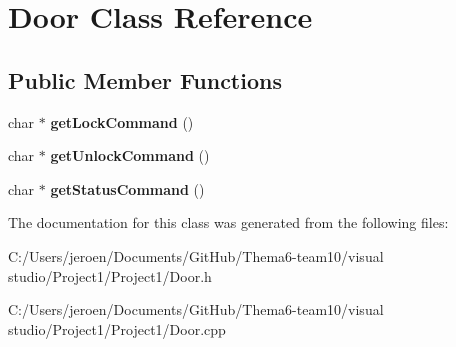 \hypertarget{class_door}{}\section{Door Class Reference}
\label{class_door}
\subsection*{Public Member Functions}
\begin{DoxyCompactItemize}
\item 
char $\ast$ {\bfseries get\+Lock\+Command} ()\hypertarget{class_door_a4283898426c5ec79a5b04885ff094f27}{}\label{class_door_a4283898426c5ec79a5b04885ff094f27}

\item 
char $\ast$ {\bfseries get\+Unlock\+Command} ()\hypertarget{class_door_a7f6bb388e70e0b98efd45f10558d07cc}{}\label{class_door_a7f6bb388e70e0b98efd45f10558d07cc}

\item 
char $\ast$ {\bfseries get\+Status\+Command} ()\hypertarget{class_door_a04f5e66e03b817d6ff9848a5fe81eefc}{}\label{class_door_a04f5e66e03b817d6ff9848a5fe81eefc}

\end{DoxyCompactItemize}


The documentation for this class was generated from the following files\+:\begin{DoxyCompactItemize}
\item 
C\+:/\+Users/jeroen/\+Documents/\+Git\+Hub/\+Thema6-\/team10/visual studio/\+Project1/\+Project1/Door.\+h\item 
C\+:/\+Users/jeroen/\+Documents/\+Git\+Hub/\+Thema6-\/team10/visual studio/\+Project1/\+Project1/Door.\+cpp\end{DoxyCompactItemize}
